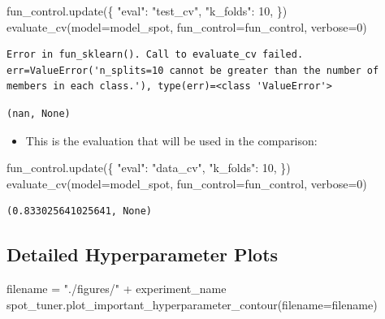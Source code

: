 \documentclass[
  letterpaper,
  DIV=11,
  numbers=noendperiod]{scrreprt}
\newenvironment{Shaded}{\begin{snugshade}}{\end{snugshade}}
\newcommand{\DecValTok}[1]{\textcolor[rgb]{0.68,0.00,0.00}{#1}}
\newcommand{\NormalTok}[1]{\textcolor[rgb]{0.00,0.23,0.31}{#1}}
\newcommand{\OperatorTok}[1]{\textcolor[rgb]{0.37,0.37,0.37}{#1}}
\newcommand{\StringTok}[1]{\textcolor[rgb]{0.13,0.47,0.30}{#1}}
\providecommand{\tightlist}{%
  \setlength{\itemsep}{0pt}\setlength{\parskip}{0pt}}\usepackage{longtable,booktabs,array}
\begin{document}
\begin{Shaded}
\begin{Highlighting}[]
\NormalTok{fun\_control.update(\{}
     \StringTok{"eval"}\NormalTok{: }\StringTok{"test\_cv"}\NormalTok{,}
     \StringTok{"k\_folds"}\NormalTok{: }\DecValTok{10}\NormalTok{,}
\NormalTok{\})}
\NormalTok{evaluate\_cv(model}\OperatorTok{=}\NormalTok{model\_spot, fun\_control}\OperatorTok{=}\NormalTok{fun\_control, verbose}\OperatorTok{=}\DecValTok{0}\NormalTok{)}
\end{Highlighting}
\end{Shaded}

\begin{verbatim}
Error in fun_sklearn(). Call to evaluate_cv failed. err=ValueError('n_splits=10 cannot be greater than the number of members in each class.'), type(err)=<class 'ValueError'>
\end{verbatim}

\begin{verbatim}
(nan, None)
\end{verbatim}

\begin{itemize}
\tightlist
\item
  This is the evaluation that will be used in the comparison:
\end{itemize}

\begin{Shaded}
\begin{Highlighting}[]
\NormalTok{fun\_control.update(\{}
     \StringTok{"eval"}\NormalTok{: }\StringTok{"data\_cv"}\NormalTok{,}
     \StringTok{"k\_folds"}\NormalTok{: }\DecValTok{10}\NormalTok{,}
\NormalTok{\})}
\NormalTok{evaluate\_cv(model}\OperatorTok{=}\NormalTok{model\_spot, fun\_control}\OperatorTok{=}\NormalTok{fun\_control, verbose}\OperatorTok{=}\DecValTok{0}\NormalTok{)}
\end{Highlighting}
\end{Shaded}

\begin{verbatim}
(0.833025641025641, None)
\end{verbatim}

\hypertarget{detailed-hyperparameter-plots-2}{%
\subsection{Detailed Hyperparameter
Plots}\label{detailed-hyperparameter-plots-2}}

\begin{Shaded}
\begin{Highlighting}[]
\NormalTok{filename }\OperatorTok{=} \StringTok{"./figures/"} \OperatorTok{+}\NormalTok{ experiment\_name}
\NormalTok{spot\_tuner.plot\_important\_hyperparameter\_contour(filename}\OperatorTok{=}\NormalTok{filename)}
\end{Highlighting}
\end{Shaded}
\end{document}
